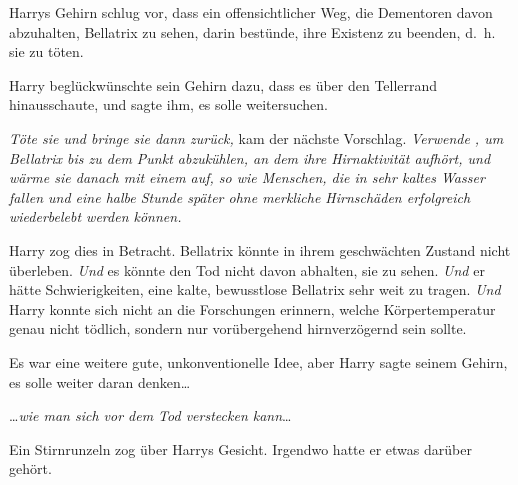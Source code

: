 Harrys Gehirn schlug vor, dass ein offensichtlicher Weg, die Dementoren davon abzuhalten, Bellatrix zu sehen, darin bestünde, ihre Existenz zu beenden, d.~h. sie zu töten.

Harry beglückwünschte sein Gehirn dazu, dass es über den Tellerrand hinausschaute, und sagte ihm, es solle weitersuchen.

\emph{Töte sie und bringe sie dann zurück,} kam der nächste Vorschlag. \emph{Verwende , um Bellatrix bis zu dem Punkt abzukühlen, an dem ihre Hirnaktivität aufhört, und wärme sie danach mit einem  auf, so wie Menschen, die in sehr kaltes Wasser fallen und eine halbe Stunde später ohne merkliche Hirnschäden erfolgreich wiederbelebt werden können.}

Harry zog dies in Betracht. Bellatrix könnte in ihrem geschwächten Zustand nicht überleben. \emph{Und} es könnte den Tod nicht davon abhalten, sie zu sehen. \emph{Und} er hätte Schwierigkeiten, eine kalte, bewusstlose Bellatrix sehr weit zu tragen. \emph{Und} Harry konnte sich nicht an die Forschungen erinnern, welche Körpertemperatur genau nicht tödlich, sondern nur vorübergehend hirnverzögernd sein sollte.

Es war eine weitere gute, unkonventionelle Idee, aber Harry sagte seinem Gehirn, es solle weiter daran denken…

…\emph{wie man sich vor dem Tod verstecken kann}…

Ein Stirnrunzeln zog über Harrys Gesicht. Irgendwo hatte er etwas darüber gehört.


